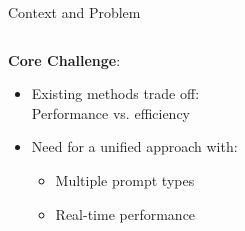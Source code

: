 \documentclass{beamer}
\begin{document}
\begin{frame}{Context and Problem}
\begin{columns}[T]
        \begin{column}{0.48\textwidth}
            \textbf{Core Challenge}:
            \begin{itemize}
                \item Existing methods trade off: \\
                    Performance vs. efficiency
                \item Need for a unified approach with:
                    \begin{itemize}
                        \item Multiple prompt types
                        \item Real-time performance
                    \end{itemize}
            \end{itemize}
        \end{column}
    \end{columns}
\end{frame}
\end{document}
